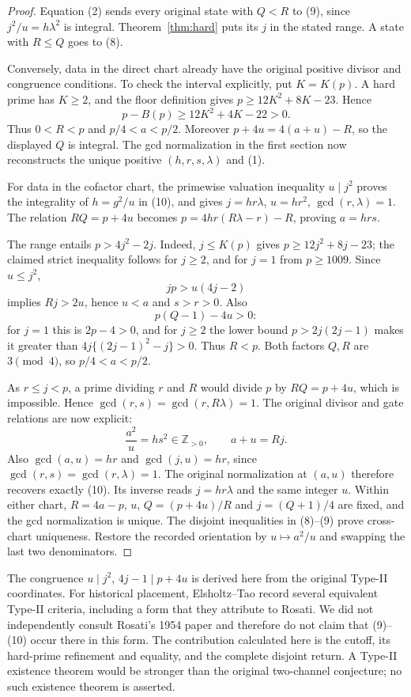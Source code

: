 \begin{proof}
Equation (2) sends every original state with $Q<R$ to (9), since
$j^2/u=h\lambda^2$ is integral. Theorem~\ref{thm:hard} puts its $j$ in the
stated range. A state with $R\le Q$ goes to (8).

Conversely, data in the direct chart already have the original positive
divisor and congruence conditions.  To check the interval explicitly, put
$K=K(p)$.  A hard prime has $K\ge2$, and the floor definition gives
$p\ge12K^2+8K-23$.  Hence
\[
 p-B(p)\ge12K^2+4K-22>0.
\]
Thus $0<R<p$ and $p/4<a<p/2$.  Moreover
$p+4u=4(a+u)-R$, so the displayed $Q$ is integral.  The gcd normalization
in the first section now reconstructs the unique positive
$(h,r,s,\lambda)$ and (1).

For data in the cofactor chart, the primewise valuation inequality
$u\mid j^2$ proves the
integrality of $h=g^2/u$ in (10), and gives $j=hr\lambda$, $u=hr^2$,
$\gcd(r,\lambda)=1$. The relation $RQ=p+4u$ becomes
$p=4hr(R\lambda-r)-R$, proving $a=hrs$.

The range entails $p>4j^2-2j$. Indeed, $j\le K(p)$ gives
$p\ge12j^2+8j-23$; the claimed strict inequality follows for $j\ge2$, and
for $j=1$ from $p\ge1009$. Since $u\le j^2$,
\[
 jp>u(4j-2)
\]
implies $Rj>2u$, hence $u<a$ and $s>r>0$. Also
\[
 p(Q-1)-4u>0:
\]
for $j=1$ this is $2p-4>0$, and for $j\ge2$ the lower bound
$p>2j(2j-1)$ makes it greater than
$4j\{(2j-1)^2-j\}>0$. Thus $R<p$. Both factors $Q,R$ are $3\pmod4$,
so $p/4<a<p/2$.

As $r\le j<p$, a prime dividing $r$ and $R$ would divide $p$ by $RQ=p+4u$,
which is impossible. Hence $\gcd(r,s)=\gcd(r,R\lambda)=1$. The original
divisor and gate relations are now explicit:
\[
 \frac{a^2}{u}=hs^2\in\mathbb Z_{>0},\qquad a+u=Rj.
\]
Also $\gcd(a,u)=hr$ and $\gcd(j,u)=hr$, since
$\gcd(r,s)=\gcd(r,\lambda)=1$.  The original normalization at $(a,u)$
therefore recovers exactly (10). Its inverse reads $j=hr\lambda$ and the same
integer $u$. Within either chart, $R=4a-p$, $u$, $Q=(p+4u)/R$ and
$j=(Q+1)/4$ are fixed, and the gcd normalization is unique. The disjoint
inequalities in (8)--(9) prove cross-chart uniqueness. Restore the recorded orientation by
$u\mapsto a^2/u$ and swapping the last two denominators.
\end{proof}

The congruence $u\mid j^2$, $4j-1\mid p+4u$ is derived here from the original
Type-II coordinates. For historical placement, Elsholtz--Tao
\cite[\S2, Proposition 2.7]{ET} record several equivalent Type-II criteria,
including a form that they attribute to Rosati. We did not independently
consult Rosati's 1954 paper and therefore do not claim that (9)--(10) occur
there in this form. The contribution calculated here is the cutoff, its
hard-prime refinement and equality, and the complete disjoint return.
A Type-II existence theorem would be stronger than the original two-channel
conjecture; no such existence theorem is asserted.

